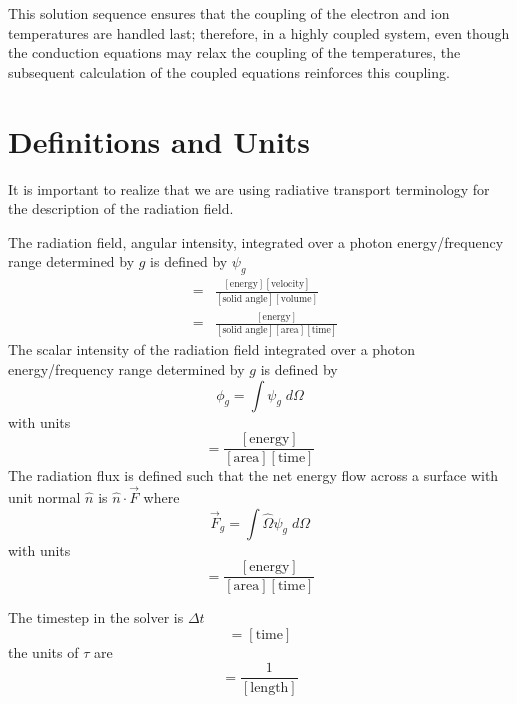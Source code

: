 \documentclass[12pt]{article}
\newcommand{\units}[1]{\ensuremath{[\mbox{#1}]}}
\begin{document}
This solution sequence ensures that the coupling of the electron and ion
temperatures are handled last; therefore, in a highly coupled system,
even though the conduction equations may relax the coupling of the temperatures,
the subsequent calculation of the coupled equations reinforces this coupling.


\appendix

\section{Definitions and Units}

It is important to realize that we are using radiative transport terminology
for the description of the radiation field.

The radiation field, angular intensity, integrated over 
a photon energy/frequency range determined by $g$ is defined by $\psi_{g}$
\begin{eqnarray}
     [\psi_{g}] &=& \frac{\units{energy} \units{velocity}}
                         {\units{solid angle} \units{volume}} \\
                &=& \frac{\units{energy}}
                         {\units{solid angle} \units{area} \units{time}}
\end{eqnarray}
The scalar intensity of the radiation field integrated over 
a photon energy/frequency range determined by $g$ is defined by
\begin{equation}
        \phi_{g} = \int \psi_{g} \; d\Omega
\end{equation}
with units
\begin{equation}
        [\phi_{g}] = \frac{\units{energy}}
                          {\units{area} \units{time}}
\end{equation}
The radiation flux is defined such that the net energy flow across
a surface with unit normal $\hat{n}$ is $\hat{n} \cdot \vec{F}$
where
\begin{equation}
        \vec{F}_{g} = \int \hat{\Omega} \psi_{g} \; d\Omega
\end{equation}
with units
\begin{equation}
        [\vec{F}_{g}] = \frac{\units{energy}}
                         {\units{area}\units{time}}
\end{equation}

The timestep in the solver is $\Delta t$
\begin{equation}
        [\Delta t] = \units{time}
\end{equation}
the units of $\tau$ are
\begin{equation}
        [\tau] = \frac{1}{\units{length}}
\end{equation}
\end{document}

